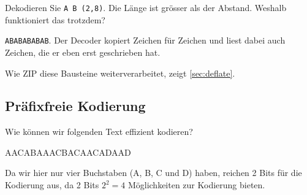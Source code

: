 \begin{mychallenge}\label{ex:lz77-ab}
	Dekodieren Sie \texttt{A B (2,8)}. Die Länge ist grösser als der Abstand. Weshalb funktioniert das trotzdem?
	\begin{myanswer}
		\texttt{ABABABABAB}. Der Decoder kopiert Zeichen für Zeichen und liest dabei auch Zeichen, die er eben erst geschrieben hat.
	\end{myanswer}
\end{mychallenge}

Wie ZIP diese Bausteine weiterverarbeitet, zeigt \cref{sec:deflate}.

\subsection{Präfixfreie Kodierung}

Wie können wir folgenden Text effizient kodieren?

\begin{center}
	AACABAAACBACAACADAAD
\end{center}

Da wir hier nur vier Buchstaben (A, B, C und D) haben, reichen 2 Bits für die Kodierung aus, da 2 Bits $2^2=4$ Möglichkeiten zur Kodierung bieten.

